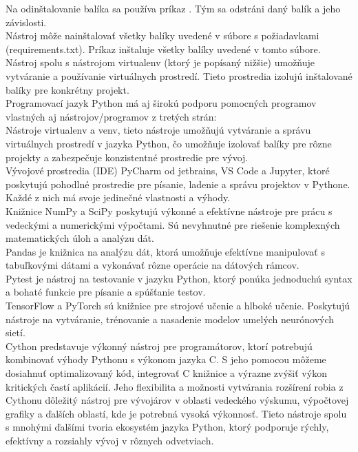 \tab[5 mm] Na odinštalovanie balíka sa používa príkaz . Tým sa odstráni daný balík a jeho závislosti.\\
\tab[5 mm] Nástroj  môže nainštalovať všetky balíky uvedené v súbore s požiadavkami (requirements.txt). Príkaz  inštaluje všetky balíky uvedené v tomto súbore.\\
\tab[5 mm] Nástroj  spolu s nástrojom virtualenv (ktorý je popísaný nižšie) umožňuje vytváranie a používanie virtuálnych prostredí. Tieto prostredia izolujú inštalované balíky pre konkrétny projekt.\\
\tab[5 mm] Programovací jazyk Python má aj širokú podporu pomocných programov vlastných aj nástrojov/programov z tretých strán:\\
\tab[5 mm] Nástroje virtualenv a venv, tieto nástroje umožňujú vytváranie a správu virtuálnych prostredí v jazyka Python, čo umožňuje izolovať balíky pre rôzne projekty a zabezpečuje konzistentné prostredie pre vývoj.\\
\tab[5 mm] Vývojové prostredia (IDE) PyCharm od jetbrains, VS Code a Jupyter, ktoré poskytujú pohodlné prostredie pre písanie, ladenie a správu projektov v Pythone. Každé z nich má svoje jedinečné vlastnosti a výhody.\\
\tab[5 mm] Knižnice NumPy a SciPy poskytujú výkonné a efektívne nástroje pre prácu s vedeckými a numerickými výpočtami. Sú nevyhnutné pre riešenie komplexných matematických úloh a analýzu dát.\\
\tab[5 mm] Pandas je knižnica na analýzu dát, ktorá umožňuje efektívne manipulovať s tabuľkovými dátami a vykonávať rôzne operácie na dátových rámcov.\\
\tab[5 mm] Pytest je nástroj na testovanie v jazyku Python, ktorý ponúka jednoduchú syntax a bohaté funkcie pre písanie a spúšťanie testov.\\
\tab[5 mm] TensorFlow a PyTorch sú knižnice pre strojové učenie a hlboké učenie. Poskytujú nástroje na vytváranie, trénovanie a nasadenie modelov umelých neurónových sietí.\\
\tab[5 mm] Cython predstavuje výkonný nástroj pre programátorov, ktorí potrebujú kombinovať výhody Pythonu s výkonom jazyka C. S jeho pomocou môžeme dosiahnuť optimalizovaný kód, integrovať C knižnice a výrazne zvýšiť výkon kritických častí aplikácií. Jeho flexibilita a možnosti vytvárania rozšírení robia z Cythonu dôležitý nástroj pre vývojárov v oblasti vedeckého výskumu, výpočtovej grafiky a ďalších oblastí, kde je potrebná vysoká výkonnosť.
\newline
\newline
\tab[5 mm] Tieto nástroje spolu s mnohými ďalšími tvoria ekosystém jazyka Python, ktorý podporuje rýchly, efektívny a rozsiahly vývoj v rôznych odvetviach.

